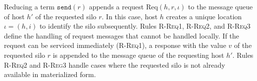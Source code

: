 \documentclass[10pt]{sigplanconf}
\theoremstyle{definition}
\theoremstyle{definition}
\begin{document}
Reducing a term $\texttt{send}(r)$ appends a request $\text{Req}(h, r, \iota)$
to the message queue of host $h'$ of the requested silo $r$. In this case, host
$h$ creates a unique location $\iota = (h, i)$ to identify the silo
subsequently. Rules \textsc{R-Req1}, \textsc{R-Req2}, and \textsc{R-Req3}
define the handling of request messages that cannot be handled locally. If the
request can be serviced immediately (\textsc{R-Req1}), a response with the
value $v$ of the requested silo $r$ is appended to the message queue of the
requesting host $h'$. Rules \textsc{R-Req2} and \textsc{R-Reg3} handle cases
where the requested silo is not already available in materialized form.

\end{document}
